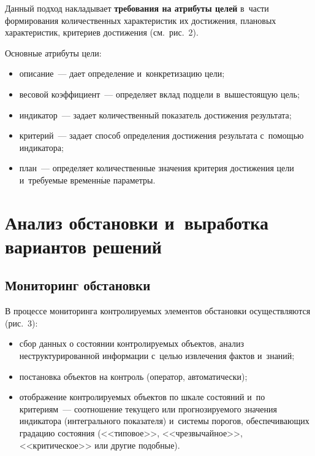 \begin{multicols}{2}
    Данный подход накладывает \textbf{требования на атрибуты целей} 
в~части формирования количественных характеристик их достижения, 
плановых характеристик, критериев достижения (см.\ рис.~2). 
    


    Основные атрибуты цели:\\[-14pt]
    \begin{itemize}
\item описание~--- дает определение и~конкретизацию цели;\\[-14pt]
\item весовой коэффициент~--- определяет вклад подцели 
в~вышестоящую цель;\\[-14pt]
\item индикатор~--- задает количественный показатель достижения 
результата;\\[-14pt]
\item критерий~--- задает способ определения достижения результата 
с~помощью индикатора;\\[-14pt]
\item план~--- определяет количественные значения критерия 
достижения цели и~требуемые вре\-мен\-н$\acute{\mbox{ы}}$е параметры.
\end{itemize}

\vspace*{-9pt}

\section{Анализ обстановки и~выработка вариантов решений}

\vspace*{-2pt}

\subsection{Мониторинг обстановки}

\vspace*{-1pt}

     В процессе мониторинга контролируемых элементов обстановки 
осуществляются (рис.~3):
     \begin{itemize}
\item сбор данных о состоянии контролируемых объектов, анализ 
неструктурированной информации с~целью извлечения фактов и~знаний; 
\item постановка объектов на контроль (оператор, автоматически); 
\item отображение контролируемых объектов по шкале состояний и~по 
критериям~--- соотношение текущего или прогнозируемого значения 
индикатора (интегрального показателя) и~сис\-те\-мы порогов, обеспечивающих 
градацию состояния (<<типовое>>, <<чрезвычайное>>, <<критическое>> 
или другие подобные).
\end{itemize}


\end{multicols}
